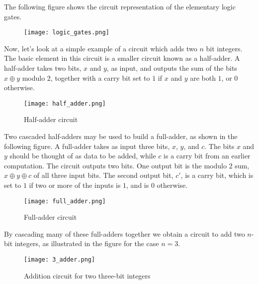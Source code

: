 The following figure shows the circuit representation of the elementary logic gates.

\begin{figure}[h]
    \centering
    \texttt{[image: logic\_gates.png]}
\end{figure}
\vspace{1em}

Now, let’s look at a simple example of a circuit which adds two $n$ bit integers. The basic element in this circuit is a smaller circuit known as a half-adder. A half-adder takes two bits, $x$ and $y$, as input, and outputs the sum of the bits $x \oplus y$ modulo $2$, together with a carry bit set to $1$ if $x$ and $y$ are both $1$, or $0$ otherwise.
\begin{figure}[h]
    \centering
    \texttt{[image: half\_adder.png]}
    \caption{Half-adder circuit}
\end{figure}
\vspace{1em}

Two cascaded half-adders may be used to build a full-adder, as shown in the following figure. A full-adder takes as input three bits, $x$, $y$, and $c$. The bits $x$ and $y$ should be thought of as data to be added, while $c$ is a carry bit from an earlier computation. The circuit outputs two bits. One output bit is the modulo $2$ sum, $x \oplus y \oplus c$ of all three input bits. The second output bit, $c'$, is a carry bit, which is set to $1$ if two or more of the inputs is $1$, and is $0$ otherwise.
\begin{figure}[h]
    \centering
    \texttt{[image: full\_adder.png]}
    \caption{Full-adder circuit}
\end{figure}
\vspace{1em}

By cascading many of these full-adders together we obtain a circuit to add two $n$-bit
integers, as illustrated in the figure for the case $n = 3$.
\begin{figure}[h]
    \centering
    \texttt{[image: 3\_adder.png]}
    \caption{Addition circuit for two three-bit integers}
\end{figure}
\vspace{1em}


